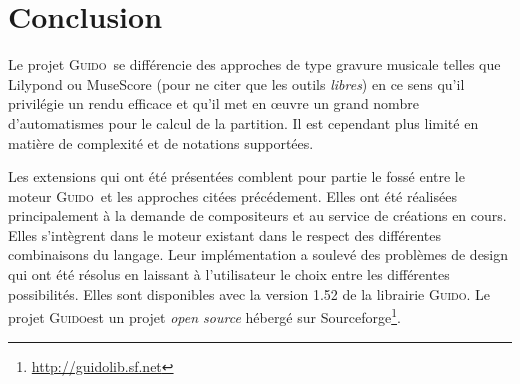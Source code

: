 \documentclass{article}
\newcommand{\guido}			{\textsc{Guido}}
\begin{document}
\section{Conclusion}\label{sec:conclusion}
Le projet \guido\ se différencie des approches de type gravure musicale telles que Lilypond ou MuseScore (pour ne citer que les outils \emph{libres}) en ce sens qu'il privilégie un rendu efficace et qu'il met en \oe{}uvre un grand nombre d'automatismes pour le calcul de la partition. Il est cependant plus limité en matière de complexité et de notations supportées. 

Les extensions qui ont été présentées comblent pour partie le fossé entre le moteur \guido\ et les approches citées précédement. Elles ont été réalisées principalement à la demande de compositeurs et au service de créations en cours. Elles s'intègrent dans le moteur existant dans le respect des différentes combinaisons du langage. Leur implémentation a soulevé des problèmes de design qui ont été résolus en laissant à l'utilisateur le choix entre les différentes possibilités. Elles sont disponibles avec la version 1.52 de la librairie \guido{}. Le projet \guido est un projet \emph{open source} hébergé sur Sourceforge\footnote{\url{http://guidolib.sf.net}}.



\balance


\end{document}
